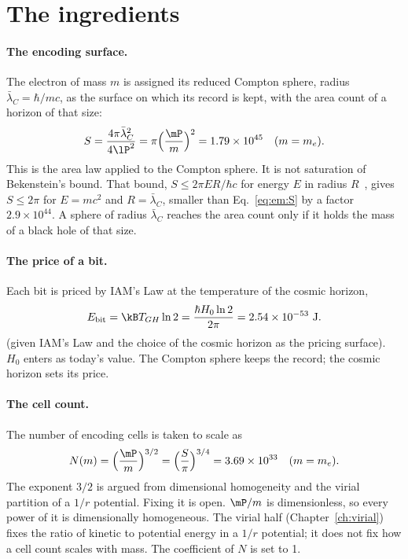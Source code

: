 \section{The ingredients}\label{sec:em:ingredients}
\paragraph{The encoding surface.} The electron of mass $m$ is assigned its reduced Compton sphere, radius $\bar\lambda_C=\hbar/mc$, as the surface
on which its record is kept, with the area count of a horizon of that size:
\begin{equation}
S=\frac{4\pi\bar\lambda_C^2}{4\lP^2}=\pi\Big(\frac{\mP}{m}\Big)^2=1.79\times10^{45}\quad(m=m_e).\label{eq:em:S}
\end{equation}
\conjecture{} This is the area law applied to the Compton sphere. It is not saturation of Bekenstein's bound. That bound, $S\le2\pi ER/\hbar c$ for
energy $E$ in radius $R$~\cite{Bekenstein1981}, gives $S\le2\pi$ for $E=mc^2$ and $R=\bar\lambda_C$, smaller than Eq.~\eqref{eq:em:S} by a factor
$2.9\times10^{44}$. \calc{} A sphere of radius $\bar\lambda_C$ reaches the area count only if it holds the mass of a black hole of that size.

\paragraph{The price of a bit.} Each bit is priced by IAM's Law at the temperature of the cosmic horizon,
\begin{equation}
E_{\rm bit}=\kB T_{GH}\ln2=\frac{\hbar H_0\ln2}{2\pi}=2.54\times10^{-53}\ {\rm J}.\label{eq:em:Ebit}
\end{equation}
\derived{} (given IAM's Law and the choice of the cosmic horizon as the pricing surface). $H_0$ enters as today's value. The Compton sphere keeps
the record; the cosmic horizon sets its price.

\paragraph{The cell count.} The number of encoding cells is taken to scale as
\begin{equation}
N(m)=\Big(\frac{\mP}{m}\Big)^{3/2}=\Big(\frac S\pi\Big)^{3/4}=3.69\times10^{33}\quad(m=m_e).\label{eq:em:N}
\end{equation}
\conjecture{} The exponent $3/2$ is argued from dimensional homogeneity and the virial partition of a $1/r$ potential. Fixing it is open.
$\mP/m$ is dimensionless, so every power of it is dimensionally homogeneous. The virial half (Chapter~\ref{ch:virial}) fixes the ratio of kinetic
to potential energy in a $1/r$ potential; it does not fix how a cell count scales with mass. \derived{} The coefficient of $N$ is set to 1.

